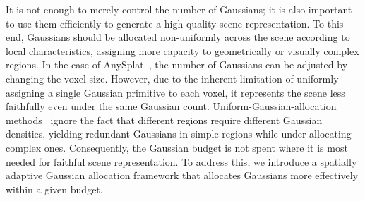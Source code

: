 It is not enough to merely control the number of Gaussians; it is also important to use them efficiently to generate a high-quality scene representation.
To this end, Gaussians should be allocated non-uniformly across the scene according to local characteristics, assigning more capacity to geometrically or visually complex regions.
In the case of AnySplat~\cite{jiang2025anysplat}, the number of Gaussians can be adjusted by changing the voxel size.
However, due to the inherent limitation of uniformly assigning a single Gaussian primitive to each voxel, it represents the scene less faithfully even under the same Gaussian count.
Uniform-Gaussian-allocation methods~\cite{charatan2024pixelsplat, chen2024mvsplat, xu2025depthsplat, ye2024nopo, li2025vicasplat, zhang2025flare, huang2025spfsplat, jiang2025anysplat} ignore the fact that different regions require different Gaussian densities, yielding redundant Gaussians in simple regions while under-allocating complex ones.
Consequently, the Gaussian budget is not spent where it is most needed for faithful scene representation.
To address this, we introduce a spatially adaptive Gaussian allocation framework that allocates Gaussians more effectively within a given budget.